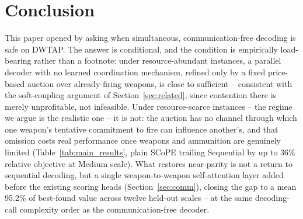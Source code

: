 
\section{Conclusion}
\label{sec:conclusion}

This paper opened by asking when simultaneous, communication-free decoding is safe on DWTAP. The answer is conditional, and the condition is empirically load-bearing rather than a footnote: under resource-abundant instances, a parallel decoder with no learned coordination mechanism, refined only by a fixed price-based auction over already-firing weapons, is close to sufficient -- consistent with the soft-coupling argument of Section~\ref{sec:related}, since contention there is merely unprofitable, not infeasible. Under resource-scarce instances -- the regime we argue is the realistic one -- it is not: the auction has no channel through which one weapon's tentative commitment to fire can influence another's, and that omission costs real performance once weapons and ammunition are genuinely limited (Table~\ref{tab:main_results}, plain SCoPE trailing Sequential by up to 36\% relative objective at Medium scale). What restores near-parity is not a return to sequential decoding, but a single weapon-to-weapon self-attention layer added before the existing scoring heads (Section~\ref{sec:comm}), closing the gap to a mean 95.2\% of best-found value across twelve held-out scales -- at the same decoding-call complexity order as the communication-free decoder.

